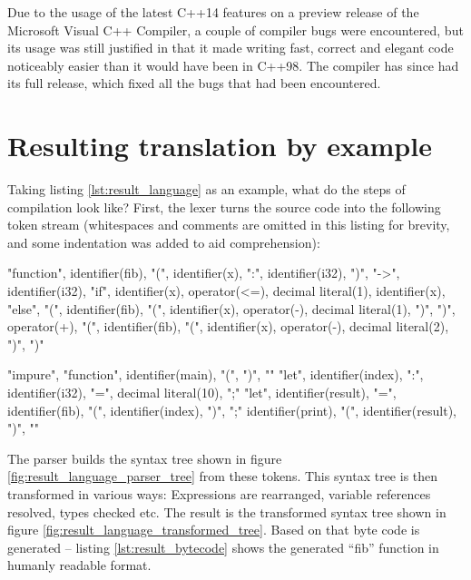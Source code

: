 Due to the usage of the latest C++14 features on a preview release of the Microsoft Visual C++ Compiler, a couple of compiler bugs were encountered, but its usage was still justified in that it made writing fast, correct and elegant code noticeably easier than it would have been in C++98. The compiler has since had its full release, which fixed all the bugs that had been encountered.


\section{Resulting translation by example}

Taking listing \ref{lst:result_language} as an example, what do the steps of compilation look like? First, the lexer turns the source code into the following token stream (whitespaces and comments are omitted in this listing for brevity, and some indentation was added to aid comprehension):

\begin{codelisting}[caption="Abridged tokens of listing \ref{lst:result_language}"]
"function", identifier(fib), "(", identifier(x), ":", identifier(i32), ")", "->", identifier(i32),
    "if", identifier(x), operator(<=), decimal literal(1),
        identifier(x),
    "else",
        "(", identifier(fib), "(", identifier(x), operator(-), decimal literal(1), ")", ")", operator(+), "(", identifier(fib), "(", identifier(x), operator(-), decimal literal(2), ")", ")"

"impure", "function", identifier(main), "(", ")",
"{"
    "let", identifier(index), ":", identifier(i32), "=", decimal literal(10), ";"
    "let", identifier(result), "=", identifier(fib), "(", identifier(index), ")", ";"
    identifier(print), "(", identifier(result), ")",
"}"
\end{codelisting}

The parser builds the syntax tree shown in figure \ref{fig:result_language_parser_tree} from these tokens. This syntax tree is then transformed in various ways: Expressions are rearranged, variable references resolved, types checked etc. The result is the transformed syntax tree shown in figure \ref{fig:result_language_transformed_tree}. Based on that byte code is generated -- listing \ref{lst:result_bytecode} shows the generated ``fib'' function in humanly readable format.

